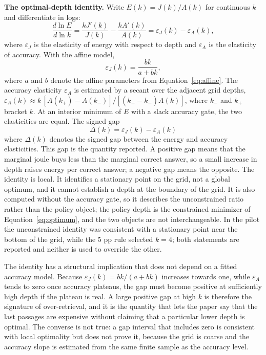 \documentclass[a4paper,fleqn]{cas-sc}
\begin{document}
\textbf{The optimal-depth identity.} Write $E(k)=J(k)/A(k)$ for continuous $k$ and differentiate in logs:
\begin{equation}\label{eq:identity}
  \frac{d\ln E}{d\ln k}
  =\frac{kJ'(k)}{J(k)}-\frac{kA'(k)}{A(k)}
  =\varepsilon_{J}(k)-\varepsilon_{A}(k),
\end{equation}
where $\varepsilon_{J}$ is the elasticity of energy with respect to depth and $\varepsilon_{A}$ is the elasticity of accuracy. With the affine model,
\begin{equation}\label{eq:epsJ}
  \varepsilon_{J}(k)=\frac{bk}{a+bk},
\end{equation}
where $a$ and $b$ denote the affine parameters from Equation~\eqref{eq:affine}. The accuracy elasticity $\varepsilon_{A}$ is estimated by a secant over the adjacent grid depths, $\varepsilon_{A}(k)\approx k\,[A(k_{+})-A(k_{-})]/[(k_{+}-k_{-})A(k)]$, where $k_{-}$ and $k_{+}$ bracket $k$. At an interior minimum of $E$ with a slack accuracy gate, the two elasticities are equal. The signed gap
\begin{equation}\label{eq:gap}
  \Delta(k)=\varepsilon_{J}(k)-\varepsilon_{A}(k)
\end{equation}
where $\Delta(k)$ denotes the signed gap between the energy and accuracy elasticities. This gap is the quantity reported. A positive gap means that the marginal joule buys less than the marginal correct answer, so a small increase in depth raises energy per correct answer; a negative gap means the opposite. The identity is local. It identifies a stationary point on the grid, not a global optimum, and it cannot establish a depth at the boundary of the grid. It is also computed without the accuracy gate, so it describes the unconstrained ratio rather than the policy object; the policy depth is the constrained minimizer of Equation~\eqref{eq:optimum}, and the two objects are not interchangeable. In the pilot the unconstrained identity was consistent with a stationary point near the bottom of the grid, while the 5 pp rule selected $k=4$; both statements are reported and neither is used to override the other.

The identity has a structural implication that does not depend on a fitted accuracy model. Because $\varepsilon_{J}(k)=bk/(a+bk)$ increases towards one, while $\varepsilon_{A}$ tends to zero once accuracy plateaus, the gap must become positive at sufficiently high depth if the plateau is real. A large positive gap at high $k$ is therefore the signature of over-retrieval, and it is the quantity that lets the paper say that the last passages are expensive without claiming that a particular lower depth is optimal. The converse is not true: a gap interval that includes zero is consistent with local optimality but does not prove it, because the grid is coarse and the accuracy slope is estimated from the same finite sample as the accuracy level.
\end{document}
